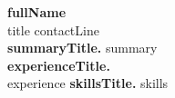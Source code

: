 \documentclass[10pt,a4paper]{article}
\begin{document}
{\Large\textbf{{{fullName}}}}\\[2pt]
{{title}} \textbullet{} {{contactLine}}\\[8pt]
\textbf{{{summaryTitle}}.} {{summary}}\\[8pt]
\textbf{{{experienceTitle}}.}\\[2pt]
{{experience}}
\textbf{{{skillsTitle}}.} {{skills}}
\end{document}
